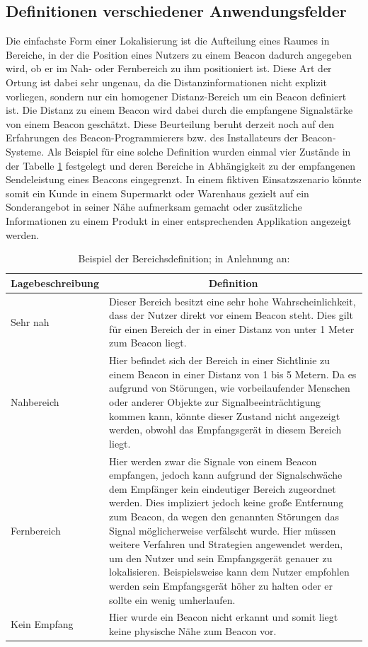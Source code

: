\subsection{Definitionen verschiedener Anwendungsfelder}
Die einfachste Form einer Lokalisierung ist die Aufteilung eines Raumes in Bereiche, in der die Position eines Nutzers zu einem Beacon dadurch angegeben wird, ob er im Nah- oder Fernbereich zu ihm positioniert ist. Diese Art der Ortung ist dabei sehr ungenau, da die Distanzinformationen nicht explizit vorliegen, sondern nur ein homogener Distanz-Bereich um ein Beacon definiert ist. Die Distanz zu einem Beacon wird dabei durch die empfangene Signalstärke von einem Beacon geschätzt. Diese Beurteilung beruht derzeit noch auf den Erfahrungen des Beacon-Programmierers bzw. des Installateurs der Beacon-Systeme. Als Beispiel für eine solche Definition wurden einmal vier Zustände in der Tabelle \ref{table:Ranging} festgelegt und deren Bereiche in Abhängigkeit zu der empfangenen Sendeleistung eines Beacons eingegrenzt. In einem fiktiven Einsatzszenario könnte somit ein Kunde in einem Supermarkt oder Warenhaus gezielt auf ein Sonderangebot in seiner Nähe aufmerksam gemacht oder zusätzliche Informationen zu einem Produkt in einer entsprechenden Applikation angezeigt werden.    
\begin{table}[H]
\centering
\begin{tabular}{|>{\centering}p{4cm}|m{12cm}|}
\hline
\rowcolor{gray} \textbf{Lagebeschreibung} & \multicolumn{1}{c}{\textbf{Definition}} \\ \hline
Sehr nah & Dieser Bereich besitzt eine sehr hohe Wahrscheinlichkeit, dass der Nutzer direkt vor einem Beacon steht. Dies gilt für einen Bereich der in einer Distanz von unter 1 Meter zum Beacon liegt. \\ \hline
Nahbereich & Hier befindet sich der Bereich in einer Sichtlinie zu einem Beacon in einer Distanz von 1 bis 5 Metern. Da es aufgrund von Störungen, wie vorbeilaufender Menschen oder anderer Objekte zur Signalbeeinträchtigung kommen kann, könnte dieser Zustand nicht angezeigt werden, obwohl das Empfangsgerät in diesem Bereich liegt.\\ \hline
Fernbereich & Hier werden zwar die Signale von einem Beacon empfangen, jedoch kann aufgrund der Signalschwäche dem Empfänger kein eindeutiger Bereich zugeordnet werden. Dies impliziert jedoch keine große Entfernung zum Beacon, da wegen den genannten Störungen das Signal möglicherweise verfälscht wurde. Hier müssen weitere Verfahren und Strategien angewendet werden, um den Nutzer und sein Empfangsgerät genauer zu lokalisieren. Beispielsweise kann dem Nutzer empfohlen werden sein Empfangsgerät höher zu halten oder er sollte ein wenig umherlaufen.\\ \hline
Kein Empfang & Hier wurde ein Beacon nicht erkannt und somit liegt keine physische Nähe zum Beacon vor.\\ \hline
\end{tabular}
\caption{Beispiel der Bereichsdefinition; in Anlehnung an: \cite{GSwiB}}
\label{table:Ranging}
\end{table}
